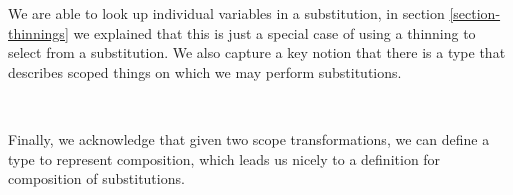 We are able to look up individual variables in a substitution, in section
\ref{section-thinnings} we explained that this is just a special case of
using a thinning to select from a substitution. We also capture a key notion
that there is a type that describes scoped things on which we may perform
substitutions.
\begin{code}%
\>[0]\AgdaSpace{}%
\AgdaSymbol{:}\AgdaSpace{}%
\AgdaSpace{}%
\AgdaSpace{}%
\<%
\\
\>[0]\AgdaSpace{}%
\AgdaSpace{}%
\AgdaSymbol{=}\AgdaSpace{}%
\AgdaSpace{}%
\AgdaSymbol{\{}\AgdaSymbol{\}}\AgdaSpace{}%
\AgdaSymbol{\{}\AgdaSymbol{\}}\AgdaSpace{}%
\AgdaSpace{}%
\AgdaSpace{}%
\AgdaSpace{}%
\AgdaSpace{}%
\AgdaSpace{}%
\AgdaOperator{\AgdaFunction{⇒[}}\AgdaSpace{}%
\AgdaSpace{}%
\AgdaOperator{\AgdaFunction{]}}\AgdaSpace{}%
\AgdaSpace{}%
\AgdaSpace{}%
\AgdaSpace{}%
\<%
\end{code}
Finally, we acknowledge that given two scope transformations, we can define
a type to represent composition, which leads us nicely to a definition for
composition of substitutions.

